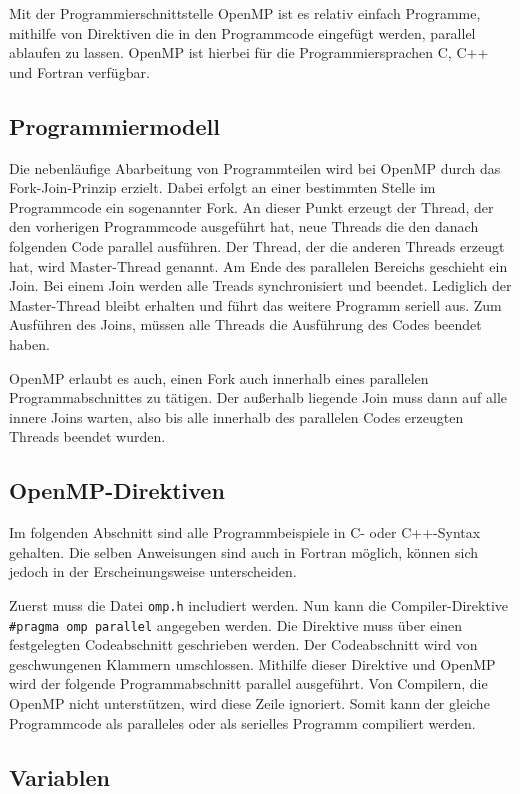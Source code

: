 \documentclass[../main.tex]{subfiles}
\begin{document}
Mit der Programmierschnittstelle OpenMP ist es relativ einfach Programme, mithilfe von Direktiven die in den Programmcode eingefügt werden, parallel ablaufen zu lassen. OpenMP ist hierbei für die Programmiersprachen C, C++ und Fortran verfügbar.

\subsection{Programmiermodell}

Die nebenläufige Abarbeitung von Programmteilen wird bei OpenMP durch das Fork-Join-Prinzip erzielt. Dabei erfolgt an einer bestimmten Stelle im Programmcode ein sogenannter Fork. An dieser Punkt erzeugt der Thread, der den vorherigen Programmcode ausgeführt hat, neue Threads die den danach folgenden Code parallel ausführen. Der Thread, der die anderen Threads erzeugt hat, wird Master-Thread genannt. Am Ende des parallelen Bereichs geschieht ein Join. Bei einem Join werden alle Treads synchronisiert und beendet. Lediglich der Master-Thread bleibt erhalten und führt das weitere Programm seriell aus. Zum Ausführen des Joins, müssen alle Threads die Ausführung des Codes beendet haben.

OpenMP erlaubt es auch, einen Fork auch innerhalb eines parallelen Programmabschnittes zu tätigen. Der außerhalb liegende Join muss dann auf alle innere Joins warten, also bis alle innerhalb des parallelen Codes erzeugten Threads beendet wurden.

\subsection{OpenMP-Direktiven}

Im folgenden Abschnitt sind alle Programmbeispiele in C- oder C++-Syntax gehalten. Die selben Anweisungen sind auch in Fortran möglich, können sich jedoch in der Erscheinungsweise unterscheiden.

Zuerst muss die Datei \texttt{omp.h} includiert werden. Nun kann die Compiler-Direktive \texttt{\#pragma\ omp\ parallel} angegeben werden. Die Direktive muss über einen festgelegten Codeabschnitt geschrieben werden. Der Codeabschnitt wird von geschwungenen Klammern umschlossen. Mithilfe dieser Direktive und OpenMP wird der folgende Programmabschnitt parallel ausgeführt. Von Compilern, die OpenMP nicht unterstützen, wird diese Zeile ignoriert. Somit kann der gleiche Programmcode als paralleles oder als serielles Programm compiliert werden.

\subsection{Variablen}
\end{document}
